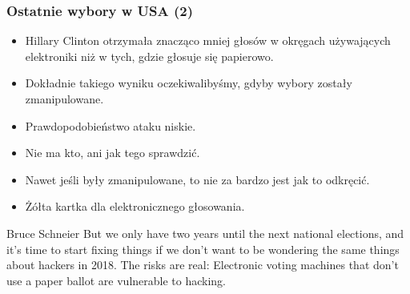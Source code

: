 \documentclass{beamer}
\begin{document}
\begin{frame}
\frametitle{Ostatnie wybory w USA (2)} \pause
\begin{itemize}
\item Hillary Clinton otrzymała znacząco mniej głosów w okręgach używających elektroniki niż w tych, gdzie głosuje się papierowo. \pause
\item Dokładnie takiego wyniku oczekiwalibyśmy, gdyby wybory zostały zmanipulowane.\pause
\item Prawdopodobieństwo ataku niskie.\pause
\item Nie ma kto, ani jak tego sprawdzić.\pause
\item Nawet jeśli były zmanipulowane, to nie za bardzo jest jak to odkręcić.\pause
\item Żółta kartka dla elektronicznego głosowania.
\end{itemize}
\begin{block}{Bruce Schneier}
But we only have two years until the next national elections, and it's time to start fixing things if we don't want to be wondering the same things about hackers in 2018. The risks are real: Electronic voting machines that don't use a paper ballot are vulnerable to hacking.
\end{block}
\end{frame}
 
\end{document}
